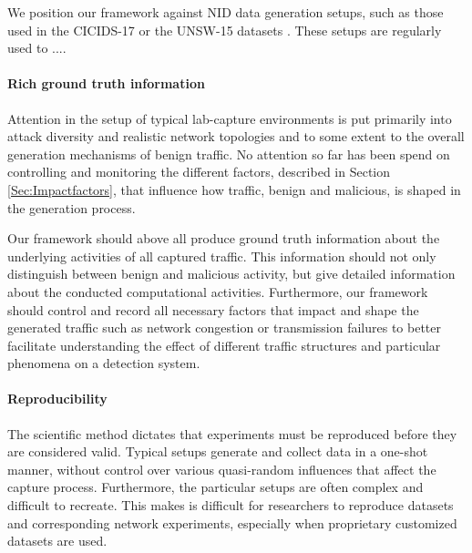 \documentclass{article}
\begin{document}
We position our framework against NID data generation setups, such as those used in the CICIDS-17 or the UNSW-15 datasets \cite{moustafa2015unsw,sharafaldin2018towards}. These setups are regularly used to ....







\paragraph{Rich ground truth information} Attention in the setup of typical lab-capture environments is put primarily into attack diversity and realistic network topologies and to some extent to the overall generation mechanisms of benign traffic. No attention so far has been spend on controlling and monitoring the different factors, described in Section \ref{Sec:Impactfactors}, that influence how traffic, benign and malicious, is shaped in the generation process. 

Our framework should above all produce ground truth information about the underlying activities of all captured traffic. This information should not only distinguish between benign and malicious activity, but give detailed information about the conducted computational activities. Furthermore, our framework should control and record all necessary factors that impact and shape the generated traffic such as network congestion or transmission failures to better facilitate understanding the effect of different traffic structures and particular phenomena on a detection system.


\paragraph{Reproducibility} The scientific method dictates that experiments must be reproduced  before  they  are  considered  valid. Typical setups generate and collect data in a one-shot manner, without control over various quasi-random influences that affect the capture process. Furthermore, the particular setups are often complex and difficult to recreate. This makes is difficult for researchers to reproduce datasets and corresponding network experiments, especially when proprietary customized datasets are used. 
\end{document}
